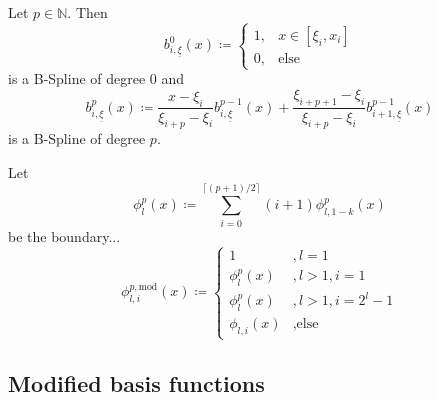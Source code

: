 \documentclass[
  a4paper,  %
  twoside,  %
  bibliography=totoc,
  headsepline,
  cleardoublepage=empty,
  parskip=half,
  draft=false
]{scrbook}
\begin{document}
\begin{definition}[B-Splines]
Let $p \in \mathds{N}$.
Then
\begin{equation}
b^0_{i,\underline{\xi}}(x) \coloneqq
\begin{cases}
    1, & x \in [\xi_i,x_i] \\
   0, & \text{else}
\end{cases}
\end{equation}
is a B-Spline of degree $0$ and
\begin{equation}
b_{i,\underline{\xi}}^p(x) \coloneqq \frac{x - \xi_i}{\xi_{i + p} - \xi_i} b_{i,\underline{\xi}}^{p-1}(x) + \frac{\xi_{i+p+1} - \xi_i}{\xi_{i + p} - \xi_i} b_{i+1,\underline{\xi}}^{p-1}(x) 
\end{equation}
is a B-Spline of degree $p$.
\end{definition}

\begin{definition}
Let
\begin{equation}
\phi_l^p(x) \coloneqq \sum_{i=0}^{\lceil (p+1)/2 \rceil} (i+1) \phi^p_{l,1-k}(x)
\end{equation}
be the boundary...
\begin{equation}
\phi^{p,\text{mod}}_{l,i}(x) \coloneqq
\begin{cases}
1 &, l=1\\
\phi^p_{l}(x)&, l>1, i=1\\
\phi^p_{l}(x)&, l>1, i=2^l - 1\\
\phi_{l,i}(x)&, \text{else}
\end{cases}
\nonumber
\end{equation}
\end{definition}


\subsection{Modified basis functions}
\end{document}
